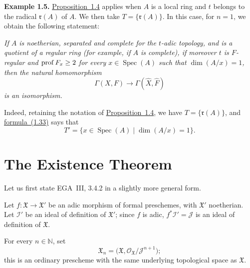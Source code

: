 \noindent\textbf{Example 1.5.}\quad
\hyperref[IX.1.4]{Proposition~1.4} applies when $A$ is a local ring and $t$ belongs to the
radical $\mathfrak r(A)$ of $A$. We then take
$T=\{\mathfrak r(A)\}$. In this case, for $n=1$, we obtain the following
statement:

\medskip
{\itshape If $A$ is noetherian, separated and complete for the $t$-adic
topology, and is a quotient of a regular ring (for example, if $A$ is
complete), if moreover $t$ is $F$-regular and $\operatorname{prof} F_x\ge2$ for every
$x\in\operatorname{Spec}(A)$ such that $\dim(A/x)=1$, then the natural
homomorphism
\[
  \Gamma(X,F)\longrightarrow\Gamma(\widehat X,\widehat F)
\]
is an isomorphism.}

\medskip
Indeed, retaining the notation of \hyperref[IX.1.4]{Proposition~1.4}, we have
$T=\{\mathfrak r(A)\}$, and \hyperref[eq:IX.1.33]{formula~(1.33)} says that
\[
  T'=\{x\in\operatorname{Spec}(A)\mid\dim(A/x)=1\}.
\]

\medskip
{}

\setcounter{section}{1}
\section{The Existence Theorem}\label{IX.2}

Let us first state EGA~III, 3.4.2 in a slightly more general form.

Let $f:\mathfrak X\to\mathfrak X'$ be an adic
morphism of formal preschemes, with $\mathfrak X'$ noetherian.
Let $\mathcal I'$ be an ideal of definition of $\mathfrak X'$; since $f$ is
adic,
$f^*\mathcal I'=\mathcal J$ is an ideal of definition of
$\mathfrak X$.

For every $n\in\mathbb N$, set
\begin{equation}\label{eq:IX.2.1}
  \mathfrak X_n=
  \bigl(\mathfrak X,\mathcal O_{\mathfrak X}/\mathcal J^{n+1}\bigr);
\end{equation}
this is an ordinary prescheme with the same underlying topological space as
$\mathfrak X$.

